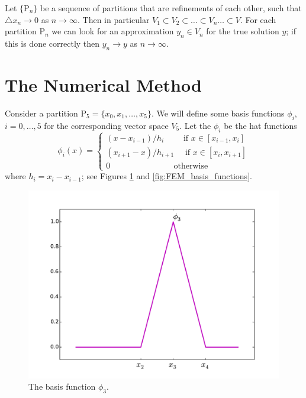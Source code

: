 Let $\{\mathrm{P}_n\}$ be a sequence of partitions that are refinements of each other, such that $\triangle x_n \to 0$ as $n \to \infty$.
Then in particular $V_1 \subset V_2 \subset \ldots \subset V_n \ldots \subset V$.
For each partition $\mathrm{P}_n$ we can look for an approximation $y_n \in V_n$ for the true solution $y$; if this is done  correctly then $y_n \to y$ as $n \to \infty$.

\section*{The Numerical Method}
Consider a partition $\mathrm{P}_5 = \{x_0, x_1, \ldots, x_5\}$.
We will define some basis functions $\phi_i$, $i = 0, \ldots, 5$ for the corresponding vector space $V_5$.
Let the $\phi_i$ be the hat functions 
\[\phi_i(x) = \begin{cases}
(x - x_{i-1})/h_i \quad \quad\text{ if } x \in [x_{i-1},x_i]\\
 (x_{i+1} - x)/h_{i+1} \quad \text{ if } x \in [x_{i},x_{i+1}]\\
0 \quad \quad \quad \quad \quad \quad \quad \,\,\text{ otherwise}
\end{cases}\]
where $h_i = x_i - x_{i-1}$; see Figures \ref{fig:FEM_one_basis_function} and \ref{fig:FEM_basis_functions}. 

\begin{figure}[ht]
\centering
\includegraphics[width=\textwidth]{one_basis_function.pdf}
\caption{The basis function $\phi_3$.}
\label{fig:FEM_one_basis_function}
\end{figure}

